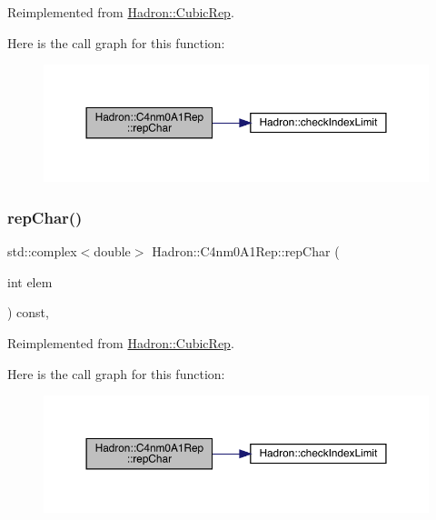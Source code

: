 Reimplemented from \mbox{\hyperlink{structHadron_1_1CubicRep_af45227106e8e715e84b0af69cd3b36f8}{Hadron\+::\+Cubic\+Rep}}.

Here is the call graph for this function\+:
\nopagebreak
\begin{figure}[H]
\begin{center}
\leavevmode
\includegraphics[width=350pt]{d8/d28/structHadron_1_1C4nm0A1Rep_ac54e244df5f9d7618d3033c48a7fb020_cgraph}
\end{center}
\end{figure}
\mbox{\label{structHadron_1_1C4nm0A1Rep_ac54e244df5f9d7618d3033c48a7fb020}} 
\subsubsection{\texorpdfstring{repChar()}{repChar()}\hspace{0.1cm}{\footnotesize\ttfamily [2/2]}}
{\footnotesize\ttfamily std\+::complex$<$double$>$ Hadron\+::\+C4nm0\+A1\+Rep\+::rep\+Char (\begin{DoxyParamCaption}\item[{int}]{elem }\end{DoxyParamCaption}) const\hspace{0.3cm}{\ttfamily [inline]}, {\ttfamily [virtual]}}



Reimplemented from \mbox{\hyperlink{structHadron_1_1CubicRep_af45227106e8e715e84b0af69cd3b36f8}{Hadron\+::\+Cubic\+Rep}}.

Here is the call graph for this function\+:
\nopagebreak
\begin{figure}[H]
\begin{center}
\leavevmode
\includegraphics[width=350pt]{d8/d28/structHadron_1_1C4nm0A1Rep_ac54e244df5f9d7618d3033c48a7fb020_cgraph}
\end{center}
\end{figure}
\mbox{\label{structHadron_1_1C4nm0A1Rep_a18af771ed96478090f052459dd7a70da}} 
